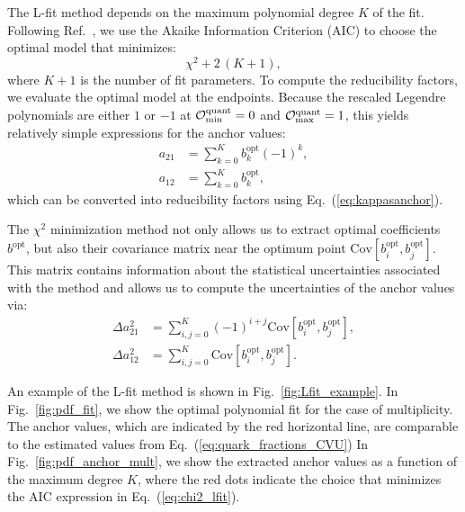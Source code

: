 \documentclass[aps,prd,twocolumn,preprintnumbers,nofootinbib,longbibliography,floatfix]{revtex4-1}
\DeclareRobustCommand{\Fig}[1]{Fig.~\ref{#1}}
\DeclareRobustCommand{\Eq}[1]{Eq.~(\ref{#1})}
\DeclareRobustCommand{\Ref}[1]{Ref.~\cite{#1}}
\newcommand{\figO}{\mathcal{O}}
\begin{document}
The L-fit method depends on the maximum polynomial degree $K$ of the fit.
%
Following \Ref{Williams:2017gwf}, we use the Akaike Information Criterion (AIC) \cite{AIC_original} to choose the optimal model that minimizes:
%
\begin{equation}
	\chi^2 + 2 \, (K + 1),
	\label{eq:chi2_lfit}
\end{equation}
%
where $K + 1$ is the number of fit parameters.
%
To compute the reducibility factors, we evaluate the optimal model at the endpoints.
%
Because the rescaled Legendre polynomials are either $1$ or $-1$ at $\figO^{\rm quant}_{\min} = 0$ and $\figO^{\rm quant}_{\max} = 1$, this yields relatively simple expressions for the anchor values: 
%
\begin{align}
	\label{eq:kappa21_final_lfit}
	a_{21} &=\sum_{k=0}^{K}{b^{\text{opt}}_k (-1)^k},\\
	\label{eq:kappa12_final_lfit}
	a_{12} &= \sum_{k=0}^{K}b^{\text{opt}}_k,
\end{align}
%
which can be converted into reducibility factors using \Eq{eq:kappasanchor}.



The $\chi^2$ minimization method not only allows us to extract optimal coefficients $b^{\text{opt}}$, but also their covariance matrix near the optimum point $\text{Cov}[b^{\text{opt}}_i, b^{\text{opt}}_j]$.
%
This matrix contains information about the statistical uncertainties associated with the method and allows us to compute the uncertainties of the anchor values via:
%
\begin{align}
		\label{eq:kappa21_final_lfit_err}
	\Delta a_{21}^2 &= \sum_{i,j = 0}^K  (-1)^{i+j} \text{Cov}[b^{\text{opt}}_i, b^{\text{opt}}_j],
	\\
	\label{eq:kappa12_final_lfit_err}
	\Delta a_{12}^2 &= \sum_{i,j = 0}^K  \text{Cov}[b^{\text{opt}}_i, b^{\text{opt}}_j].
\end{align}



An example of the L-fit method is shown in \Fig{fig:Lfit_example}.
%
In \Fig{fig:pdf_fit}, we show the optimal polynomial fit for the case of multiplicity.
%
The anchor values, which are indicated by the red horizontal line, are comparable to the estimated values from \Eq{eq:quark_fractions_CVU}
%
In \Fig{fig:pdf_anchor_mult}, we show the extracted anchor values as a function of the maximum degree $K$, where the red dots indicate the choice that minimizes the AIC expression in \Eq{eq:chi2_lfit}. 
\end{document}
